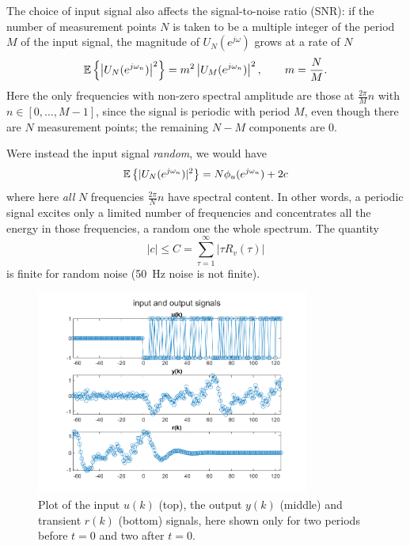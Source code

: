 The choice of input signal also affects the signal-to-noise ratio (SNR): if the number of measurement points $N$ is taken to be a multiple integer of the period $M$ of the input signal, the magnitude of $U_N(e^{j\omega})$ grows at a rate of $N$
\begin{equation}
  \label{eq:PSD-periodic-input-signal}
  \mathbb{E}\left\{\left|U_N(e^{j\omega_n})\right|^2\right\} = m^2\left|U_M(e^{j\omega_n})\right|^2,\hspace{2em} m=\frac{N}{M}.
\end{equation}
Here the only frequencies with non-zero spectral amplitude are those at $\frac{2\pi}{M}n$ with $n\in [0,\ldots,M-1]$, since the signal is periodic with period $M$, even though there are $N$ measurement points; the remaining $N-M$ components are 0.

Were instead the input signal \emph{random}, we would have
\begin{equation}
  \label{eq:PSD-random-input-signal}
  \mathbb{E}\left\{|U_N(e^{j\omega_n})|^2\right\} = N\phi_u(e^{j\omega_n}) + 2c
\end{equation}
where here \emph{all} $N$ frequencies $\frac{2\pi}{N}n$ have spectral content. In other words, a periodic signal excites only a limited number of frequencies and concentrates all the energy in those frequencies, a random one the whole spectrum. The quantity
\begin{equation*}
  |c| \le C = \sum_{\tau=1}^\infty |\tau R_v(\tau)|
\end{equation*}
is finite for random noise (50~Hz noise is not finite).

\begin{figure}[h]
  \centering
  \includegraphics[width=0.8\textwidth]{"05_lect/transient-noise-time-domain.png"}
  \caption{Plot of the input $u(k)$ (top), the output $y(k)$ (middle) and transient $r(k)$ (bottom) signals, here shown only for two periods before $t=0$ and two after $t=0$.}
  \label{fig:transient-response-time-domain}
\end{figure}

